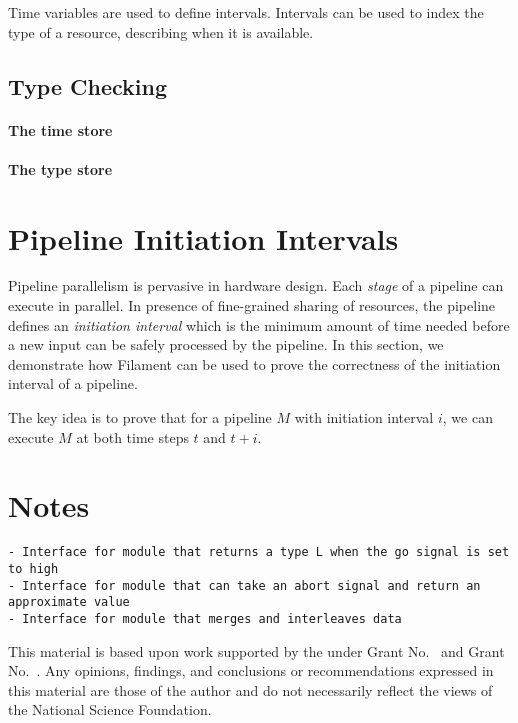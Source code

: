 \documentclass[acmsmall,review,anonymous]{acmart}
\begin{document}
Time variables are used to define intervals.
Intervals can be used to index the type of a resource, describing when it is available.


\subsection{Type Checking}

\paragraph{The time store}

\paragraph{The type store}

\ottdefncheck

\section{Pipeline Initiation Intervals}
Pipeline parallelism is pervasive in hardware design.
Each \emph{stage} of a pipeline can execute in parallel.
In presence of fine-grained sharing of resources, the pipeline defines an \emph{initiation interval}
which is the minimum amount of time needed before a new input can be safely processed by the pipeline.
In this section, we demonstrate how Filament can be used to prove the correctness of the initiation interval of a pipeline.

The key idea is to prove that for a pipeline $M$ with initiation interval $i$, we can execute $M$ at both time steps $t$ and $t+i$.

\section{Notes}
\begin{verbatim}
- Interface for module that returns a type L when the go signal is set to high
- Interface for module that can take an abort signal and return an approximate value
- Interface for module that merges and interleaves data
\end{verbatim}


\begin{acks}
  This material is based upon work supported by the
   under Grant
  No.~ and Grant
  No.~.  Any opinions, findings, and
  conclusions or recommendations expressed in this material are those
  of the author and do not necessarily reflect the views of the
  National Science Foundation.
\end{acks}


% 
\end{document}
